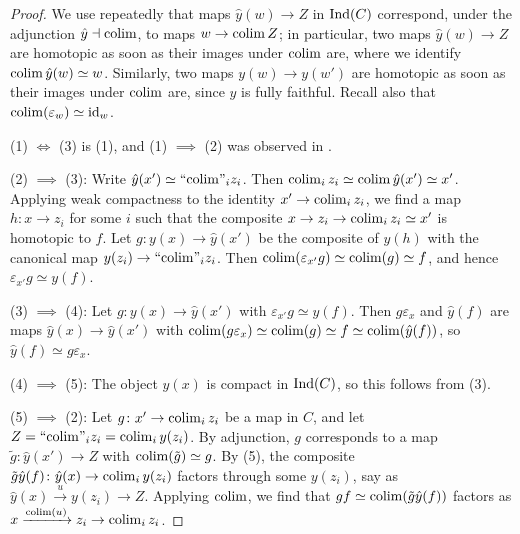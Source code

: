 	\begin{proof}
		We use repeatedly that maps $\hat{y}(w) \to Z$ in $\operatorname{Ind}(C)$ correspond, under the adjunction $\hat{y} \dashv \operatorname{colim}$, to maps $w \to \operatorname{colim} Z$; in particular, two maps $\hat{y}(w) \to Z$ are homotopic as soon as their images under $\operatorname{colim}$ are, where we identify $\operatorname{colim}\hat{y}(w) \simeq w$. Similarly, two maps $y(w) \to y(w')$ are homotopic as soon as their images under $\operatorname{colim}$ are, since $y$ is fully faithful. Recall also that $\operatorname{colim}(\varepsilon_w) \simeq \operatorname{id}_w$.

		(1) $\iff$ (3) is (1), and (1) $\implies$ (2) was observed in .

		(2) $\implies$ (3): Write $\hat{y}(x') \simeq \text{``}\!\operatorname{colim}\!\text{''}_i z_i$. Then $\operatorname{colim}_i z_i \simeq \operatorname{colim}\hat{y}(x') \simeq x'$. Applying weak compactness to the identity $x' \to \operatorname{colim}_i z_i$, we find a map $h\colon x \to z_i$ for some $i$ such that the composite $x \to z_i \to \operatorname{colim}_i z_i \simeq x'$ is homotopic to $f$. Let $g\colon y(x) \to \hat{y}(x')$ be the composite of $y(h)$ with the canonical map $y(z_i) \to \text{``}\!\operatorname{colim}\!\text{''}_i z_i$. Then $\operatorname{colim}(\varepsilon_{x'} g) \simeq \operatorname{colim}(g) \simeq f$, and hence $\varepsilon_{x'}g \simeq y(f)$.

		(3) $\implies$ (4): Let $g\colon y(x) \to \hat{y}(x')$ with $\varepsilon_{x'}g \simeq y(f)$. Then $g\varepsilon_x$ and $\hat{y}(f)$ are maps $\hat{y}(x) \to \hat{y}(x')$ with $\operatorname{colim}(g\varepsilon_x) \simeq \operatorname{colim}(g) \simeq f \simeq \operatorname{colim}(\hat{y}(f))$, so $\hat{y}(f) \simeq g\varepsilon_x$.

		(4) $\implies$ (5): The object $y(x)$ is compact in $\operatorname{Ind}(C)$, so this follows from (3).

		(5) $\implies$ (2): Let $g\colon x' \to \operatorname{colim}_i z_i$ be a map in $C$, and let $Z = \text{``}\!\operatorname{colim}\!\text{''}_i z_i = \operatorname{colim}_i y(z_i)$. By adjunction, $g$ corresponds to a map $\tilde{g}\colon \hat{y}(x') \to Z$ with $\operatorname{colim}(\tilde{g}) \simeq g$. By (5), the composite $\tilde{g}\hat{y}(f)\colon \hat{y}(x) \to \operatorname{colim}_i y(z_i)$ factors through some $y(z_i)$, say as $\hat{y}(x) \xrightarrow{u} y(z_i) \to Z$. Applying $\operatorname{colim}$, we find that $gf \simeq \operatorname{colim}(\tilde{g}\hat{y}(f))$ factors as $x \xrightarrow{\operatorname{colim}(u)} z_i \to \operatorname{colim}_i z_i$.
	\end{proof}


